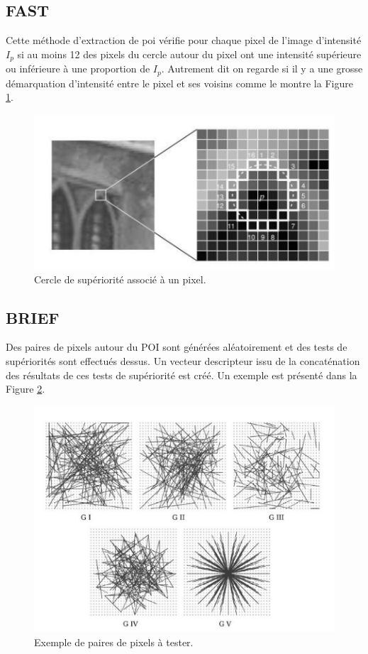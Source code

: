 \documentclass[11pt]{article}
\begin{document}
    \subsection{FAST}
      Cette méthode d'extraction de \acrshort{poi} vérifie pour chaque pixel de l'image d'intensité $I_p$ si au moins 12 des pixels
      du cercle autour du pixel ont une intensité supérieure ou inférieure à une proportion de $I_p$. Autrement dit on regarde si il y a une 
      grosse démarquation d'intensité entre le pixel et ses voisins comme le montre la Figure \ref{fig:CercleSuperiorite}.

      \begin{figure}[hbt]  
        \includegraphics[width=\textwidth]{CercleSuperiorite.png}    
        \caption{Cercle de supériorité associé à un pixel.}
        \label{fig:CercleSuperiorite}
      \end{figure}

    \subsection{BRIEF}
      Des paires de pixels autour du POI sont générées aléatoirement et des tests de supériorités sont effectués dessus. 
      Un vecteur descripteur issu de la concaténation des résultats de ces tests de supériorité est créé. Un exemple est présenté 
      dans la Figure \ref{fig:Paires}.

      \begin{figure}[hbt]  
        \includegraphics[width=\textwidth]{Paires.png}    
        \caption{Exemple de paires de pixels à tester.}
        \label{fig:Paires}
      \end{figure}   
\end{document}
